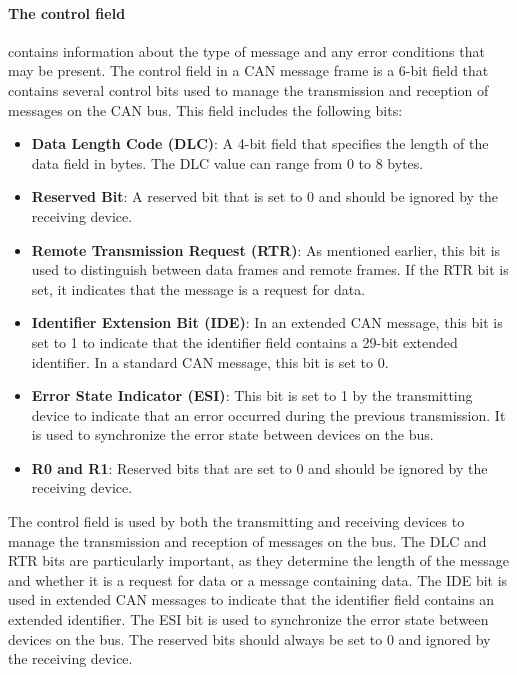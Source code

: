 
\paragraph*{The control field} contains information about the type of message and any error conditions that may be present. 
The control field in a CAN message frame is a 6-bit field that contains several control bits used to manage the transmission and reception of messages on the CAN bus. 
This field includes the following bits:

\begin{itemize}
    \item \textbf{Data Length Code (DLC)}: A 4-bit field that specifies the length of the data field in bytes. The DLC value can range from 0 to 8 bytes.
    \item \textbf{Reserved Bit}: A reserved bit that is set to 0 and should be ignored by the receiving device.
    \item \textbf{Remote Transmission Request (RTR)}: As mentioned earlier, this bit is used to distinguish between data frames and remote frames. If the RTR bit is set, it indicates that the message is a request for data.
    \item \textbf{Identifier Extension Bit (IDE)}: In an extended CAN message, this bit is set to 1 to indicate that the identifier field contains a 29-bit extended identifier. In a standard CAN message, this bit is set to 0.
    \item \textbf{Error State Indicator (ESI)}: This bit is set to 1 by the transmitting device to indicate that an error occurred during the previous transmission. It is used to synchronize the error state between devices on the bus.
    \item \textbf{R0 and R1}: Reserved bits that are set to 0 and should be ignored by the receiving device.
\end{itemize}

The control field is used by both the transmitting and receiving devices to manage the transmission and reception of messages on the bus. 
The DLC and RTR bits are particularly important, as they determine the length of the message and whether it is a request for data or a message containing data. 
The IDE bit is used in extended CAN messages to indicate that the identifier field contains an extended identifier. 
The ESI bit is used to synchronize the error state between devices on the bus. 
The reserved bits should always be set to 0 and ignored by the receiving device.

